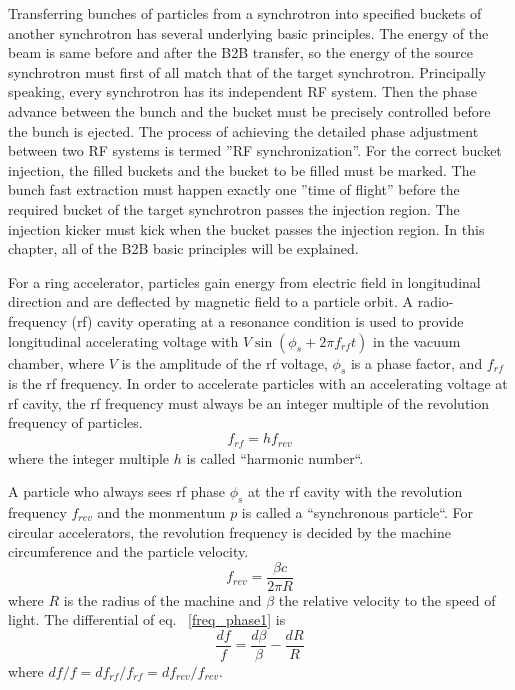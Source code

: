 Transferring bunches of particles from a synchrotron into specified buckets of another synchrotron has several underlying basic principles. The energy of the beam is same before and after the B2B transfer, so the energy of the source synchrotron must first of all match that of the target synchrotron. Principally speaking, every synchrotron has its independent RF system. Then the phase advance between the bunch and the bucket must be precisely controlled before the bunch is ejected. The process of achieving the detailed phase adjustment between two RF systems is termed ''RF synchronization''. For the correct bucket injection, the filled buckets and the bucket to be filled must be marked. The bunch fast extraction must happen exactly one ''time of flight'' before the required bucket of the target synchrotron passes the injection region. The injection kicker must kick when the bucket passes the injection region.  In this chapter, all of the B2B basic principles will be explained.  


For a ring accelerator, particles gain energy from electric field in longitudinal direction and are deflected by magnetic field to a particle orbit. A radio-frequency (rf) cavity operating at a resonance condition is used to provide longitudinal accelerating voltage with $V\sin(\phi_\mathit{s}+2\pi f_\mathit{rf}t)$ in the vacuum chamber, where $V$ is the amplitude of the rf voltage, $\phi_\mathit{s}$ is a phase factor, and $f_{\mathit{rf}}$ is the rf frequency. In order to accelerate particles with an accelerating voltage at rf cavity, the rf frequency must always be an integer multiple of the revolution frequency of particles. 
\begin{equation}
	f_{\mathit{rf}}=hf_{\mathit{rev}}
\end{equation}
where the integer multiple $h$ is called ``harmonic number``. 

A particle who always sees rf phase $\phi_\mathit{s}$ at the rf cavity with the revolution frequency $f_{\mathit{rev}}$ and the monmentum $p$ is called a ``synchronous particle``. For circular accelerators, the revolution frequency is decided by the machine circumference and the particle velocity.
\begin{equation}
f_{\mathit{rev}}=\frac{\beta c}{2\pi R} \label{freq_phase1}
\end{equation}
where $R$ is the radius of the machine and $\beta$ the relative velocity to the speed of light. The differential of eq. ~\ref{freq_phase1} is
\begin{equation}
\frac{df}{f}=\frac{d\beta}{\beta}-\frac{dR}{R} \label{dfreq_phase1}
\end{equation}
where $df/f=df_{\mathit{rf}}/f_{\mathit{rf}}=df_{\mathit{rev}}/f_{\mathit{rev}}$. 

